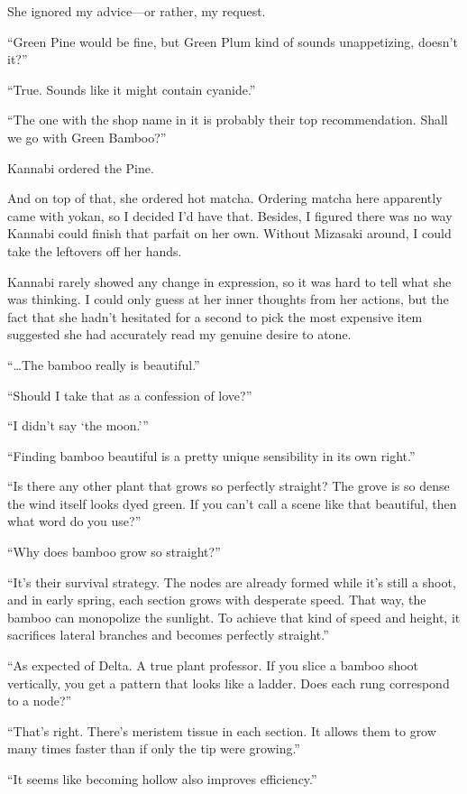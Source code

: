 \documentclass[
    a4paper,
    12pt,
    twoside,
    openany,
    UTF8,
    fontset=windows
]{ctexbook}
\begin{document}
She ignored my advice---or rather, my request.

``Green Pine would be fine, but Green Plum kind of sounds unappetizing, doesn't it?''

``True. Sounds like it might contain cyanide.''

``The one with the shop name in it is probably their top recommendation. Shall we go with Green Bamboo?''

Kannabi ordered the Pine.

And on top of that, she ordered hot matcha. Ordering matcha here apparently came with yokan, so I decided I'd have that. Besides, I figured there was no way Kannabi could finish that parfait on her own. Without Mizasaki around, I could take the leftovers off her hands.

Kannabi rarely showed any change in expression, so it was hard to tell what she was thinking. I could only guess at her inner thoughts from her actions, but the fact that she hadn't hesitated for a second to pick the most expensive item suggested she had accurately read my genuine desire to atone.

``\dots The bamboo really is beautiful.''

``Should I take that as a confession of love?''

``I didn't say `the moon.'''

``Finding bamboo beautiful is a pretty unique sensibility in its own right.''

``Is there any other plant that grows so perfectly straight? The grove is so dense the wind itself looks dyed green. If you can't call a scene like that beautiful, then what word do you use?''

``Why does bamboo grow so straight?''

``It's their survival strategy. The nodes are already formed while it's still a shoot, and in early spring, each section grows with desperate speed. That way, the bamboo can monopolize the sunlight. To achieve that kind of speed and height, it sacrifices lateral branches and becomes perfectly straight.''

``As expected of Delta. A true plant professor. If you slice a bamboo shoot vertically, you get a pattern that looks like a ladder. Does each rung correspond to a node?''

``That's right. There's meristem tissue in each section. It allows them to grow many times faster than if only the tip were growing.''

``It seems like becoming hollow also improves efficiency.''
\end{document}

